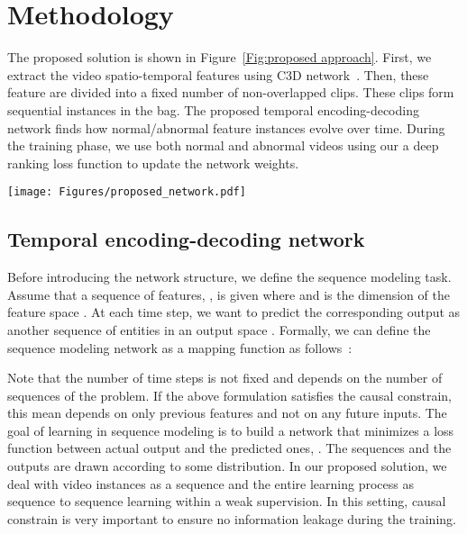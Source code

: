 \documentclass[journal]{IEEEtran}
\begin{document}
\section{Methodology}
The proposed solution is shown in Figure~\ref{Fig:proposed approach}. First, we extract the video spatio-temporal features using C3D network~\cite{tran2015learning}. Then, these feature are divided into a fixed number of non-overlapped clips. These clips form sequential instances in the bag. The proposed temporal encoding-decoding network finds how normal/abnormal feature instances evolve over time. During the training phase, we use both normal and abnormal videos using our a deep ranking loss function to update the network weights.
\begin{figure*}
	\centering
	\texttt{[image: Figures/proposed\_network.pdf]}
	\caption{Proposed approach of temporal encoding-decoding network. Normal and abnormal videos are fed into a C3D~\cite{tran2015learning} network to extract spatio-temporal features which are then divided into 32 clips to form instances. These instances are treated as sequential visual information processed by a temporal encoding-decoding network that captures how the features evolve over time and predicts an anomaly score using based on a mapping from instance to label.}
	\label{Fig:proposed approach}
\end{figure*}

\subsection{Temporal encoding-decoding network}
Before introducing the network structure, we define the sequence modeling task. Assume that a sequence of features, , is given where  and  is the dimension of the feature space . At each time step, we want to predict the corresponding output as another sequence  of entities in an output space . Formally, we can define the sequence modeling network as a mapping function  as follows~\cite{bai2018empirical}:

Note that the number of time steps  is not fixed and depends on the number of sequences of the problem. If the above formulation satisfies the causal constrain, this mean  depends on only previous features  and not on any future inputs. The goal of learning in sequence modeling is to build a network  that minimizes a loss function between actual output and the predicted ones, . The sequences and the outputs are drawn according to some distribution. In our proposed solution, we deal with video instances as a sequence and the entire learning process as sequence to sequence learning within a weak supervision. In this setting, causal constrain is very important to ensure no information leakage during the training.
\end{document}
